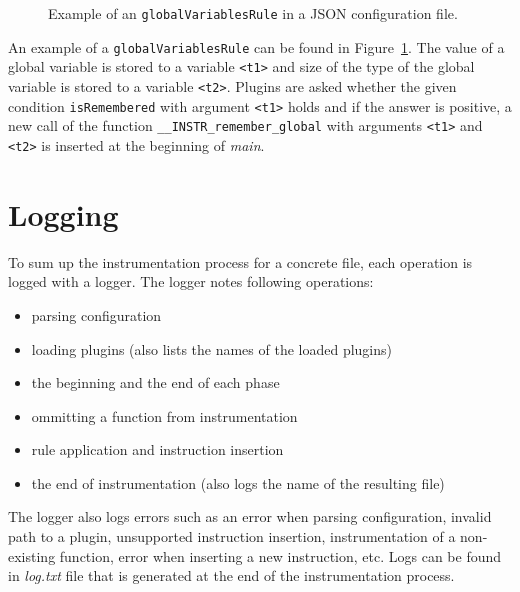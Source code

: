 \begin{figure}[h]

\caption{Example of an \texttt{globalVariablesRule} in a JSON configuration file.}
\label{fig:json_example2}
\end{figure}


An example of a \texttt{globalVariablesRule} can be found in
Figure~\ref{fig:json_example2}. The value of a global variable is stored to a
variable \texttt{<t1>} and size of the type of the global variable is stored to
a variable \texttt{<t2>}. Plugins are asked whether the given condition
\texttt{isRemembered} with argument \texttt{<t1>} holds and if the answer is
positive, a new call of the function \texttt{\_\_INSTR\_remember\_global} with
arguments \texttt{<t1>} and \texttt{<t2>} is inserted at the beginning of
\emph{main}.

\section{Logging}

To sum up the instrumentation process for a concrete file, each operation is
logged with a logger. The logger notes following operations:
\begin{itemize}
  \item parsing configuration
  \item loading plugins (also lists the names of the loaded plugins)
  \item the beginning and the end of each phase
  \item ommitting a function from instrumentation
  \item rule application and instruction insertion
  \item the end of instrumentation (also logs the name of the resulting file)
\end{itemize}
The logger also logs errors such as an error when parsing configuration, invalid
path to a plugin, unsupported instruction insertion, instrumentation of a
non-existing function, error when inserting a new instruction, etc. Logs can be
found in \emph{log.txt} file that is generated at the end of the
instrumentation process.

